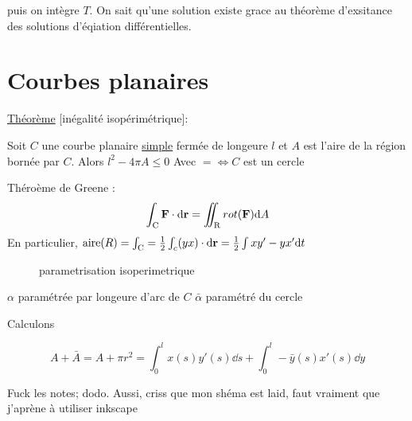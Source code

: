 puis on intègre $T$. On sait qu'une solution existe grace au théorème d'exsitance des solutions d'éqiation différentielles.

\section*{Courbes planaires}

\underline{Théorème} [inégalité isopérimétrique]:

Soit $C$ une courbe planaire \underline{simple} fermée de longeure $l$ et $A$ est l'aire de la région bornée par $C$. Alors $l^2-4\pi A\leq 0$
Avec $= \iff C$ est un cercle 

\begin{tcolorbox}[title=Rappel]	
	Théroème de Greene : $$\int_{\rm C} \vb F \cdot \dd \vb r = \iint_{\rm R} rot(\vb F) \dd A$$ 
	En particulier, $\text{aire}(R)=\int_{\rm C}=\frac{1}{2}\int_c(y x)\cdot \dd \vb r = \frac{1}{2}\int xy' - yx' \dd t$ 
\end{tcolorbox}


\begin{figure}[ht]
    \centering
    \caption{parametrisation isoperimetrique}
    \label{fig:parametrisation-isoperimetrique}
\end{figure}

$\alpha$ paramétrée par longeure d'arc de $C$ 
$\bar \alpha$ paramétré du cercle

Calculons

$$A + \bar A = A + \pi r^2 = \int_0^l x(s)y'(s)\dd s + \int_0^l - \bar y(s)x'(s) \dd y$$ 

Fuck les notes; dodo. Aussi, criss que mon shéma est laid, faut vraiment que j'aprène à utiliser inkscape



